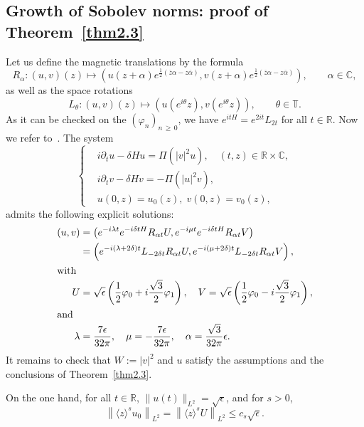 \documentclass[10pt]{amsart}
\theoremstyle{definition}\newtheorem{defi}[theo]{Definition}\newtheorem{rema}[theo]{Remark}\newtheorem{exam}[theo]{Example}\newtheorem{exem}[theo]{Example}\newtheorem{nota}[theo]{Notation}
\newcommand{\C}{\mathbb{C}}
\newcommand{\R}{\mathbb{R}}
\newcommand{\T}{\mathbb{T}}
\newcommand*\eps{\epsilon}
\newcommand*\dis{\displaystyle}
\newcommand{\<}{\langle}
\renewcommand{\>}{\rangle}
\renewcommand{\phi}{\varphi}
\begin{document}
\subsection{Growth of Sobolev norms: proof of Theorem~\ref{thm2.3}}\label{para3.3}
Let us define the magnetic translations by the formula
\[
R_{\alpha} :(u,v)(z) \mapsto \left(u(z+\alpha) e^{\frac{1}{2}(\overline z
\alpha - z \overline{\alpha})}, v(z+\alpha) e^{\frac{1}{2}(\overline z \alpha - z \overline{\alpha})} \right), \qquad \alpha \in \C,
\]
as well as the space rotations
\[
L_{\theta} :(u,v)(z) \mapsto \left(u\left(e^{i\theta}z\right), v\left(e^{i\theta}z\right) \right), \qquad \theta \in \T.
\]
As it can be checked on the $(\phi_n)_{n\,\geq\,0}$, we have $e^{itH}= e^{2it}L_{2t}$ for all $t\in \R$. Now we refer to~\cite[Section~1.7.2]{Schw-Tho}. The system
\[
\left\{
\begin{aligned}
&i\partial_{t}{u}-\delta H{u} = \Pi \left(|{v}|^2 {u}\right), \quad (t,z)\in \R\times \C,\\
&i\partial_{t}{v}-\delta H{v}= - \Pi\left(|{u}|^2 {v}\right),\\
&{u}(0,z)= u_0(z),\; {v}(0,z)= v_0(z),
\end{aligned}
\right.
\]
admits the following explicit solutions:
\begin{align*}
(u,v)&=\left(e^{-i\lambda t} e^{-i \delta t H} R_{\alpha t} U, e^{-i\mu t} e^{-i\delta t H} R_{\alpha t} V \right)\\
&=\left(e^{-i(\lambda +2\delta)t} L_{-2\delta t}R_{\alpha t} U, e^{-i(\mu +2\delta)t} L_{-2\delta t} R_{\alpha t} V \right),\\
\intertext{with}
\dis U &=\sqrt{\eps}\left(\frac12\phi_0+i\frac{\sqrt{3}}2\phi_1\right), \quad V=\sqrt{\eps}\left(\frac12\phi_0-i\frac{\sqrt{3}}2\phi_1\right),
\\
\intertext{and}
\lambda &= \frac{7\eps}{32\pi}, \quad \mu = -\frac{7\eps}{32\pi}, \quad \alpha=\frac{\sqrt{3}}{32 \pi}\eps.
\end{align*}
It remains to check that $W:=|v|^2$ and $u$ satisfy the assumptions and the conclusions of Theorem~\ref{thm2.3}.

On the one hand, for all $t\in \R$, $\|u(t)\|_{L^2}=\sqrt{\eps}$, and for $s>0$,
\begin{equation}\label{nor-0}
\left\|\<z\>^s u_0\right\|_{L^2}= \left\|\<z\>^s U\right\|_{L^2} \leq c_s \sqrt{\eps}.
\end{equation}
\end{document}
